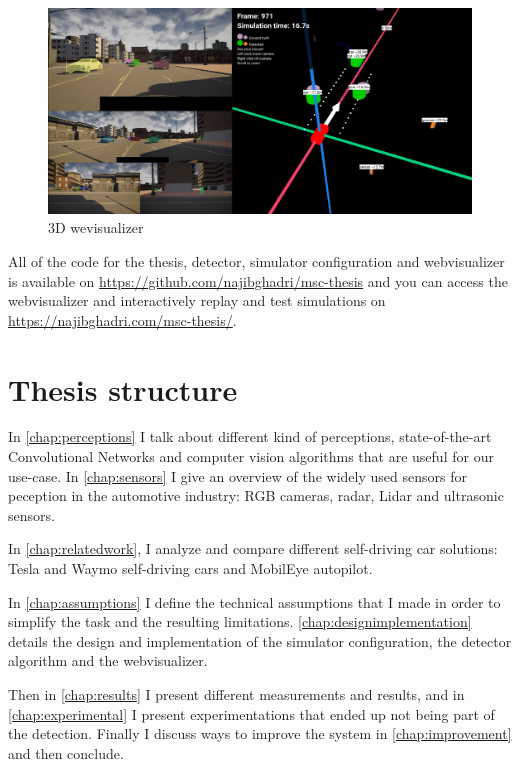 \begin{figure}[!ht]
    \centering
    \includegraphics[width=150mm, keepaspectratio]{figures/webviz2.png}
    \caption{3D wevisualizer}
    \label{fig:webviz1}
\end{figure}

All of the code for the thesis, detector, simulator configuration and
webvisualizer is available on \url{https://github.com/najibghadri/msc-thesis}
and you can access the webvisualizer and interactively replay and test
simulations on \url{https://najibghadri.com/msc-thesis/}.


\section{Thesis structure}

In \autoref{chap:perceptions} I talk about different kind of perceptions,
state-of-the-art Convolutional Networks and computer vision algorithms that are
useful for our use-case. In \autoref{chap:sensors} I give an overview of the 
widely used sensors for peception in the automotive industry: RGB cameras, radar,
Lidar and ultrasonic sensors.

In \autoref{chap:relatedwork}, I analyze and compare different self-driving  car
solutions: Tesla and Waymo self-driving cars and MobilEye autopilot.

In \autoref{chap:assumptions} I define the technical assumptions that I made in
order to simplify the task and the resulting limitations.
\autoref{chap:designimplementation} details the design and implementation of the
simulator configuration, the detector algorithm and the webvisualizer.

Then in \autoref{chap:results} I present different measurements and results, and
in \autoref{chap:experimental} I present experimentations that ended up not
being part of the detection. Finally I discuss ways to improve the system in
\autoref{chap:improvement} and then conclude.